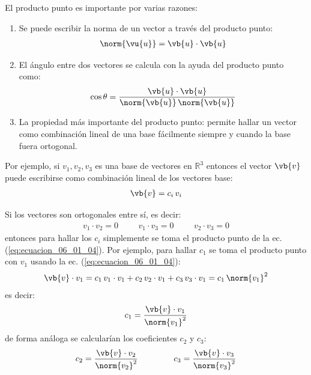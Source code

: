 El producto punto es importante por varias razones:
\begin{enumerate}
\item  Se puede escribir la norma de un vector a través del producto punto:
\begin{align*}
\norm{\vu{u}} = \vb{u} \cdot \vb{u}
\end{align*}
\item  El ángulo entre dos vectores se calcula con la ayuda del producto punto como:
\begin{align*}
\cos \theta = \dfrac{\vb{u} \cdot \vb{u}}{\norm{\vb{u}} \, \norm{\vb{u}}}
\end{align*}
\item  La propiedad más importante del producto punto: permite hallar un vector como combinación lineal de una base fácilmente siempre y cuando la base fuera ortogonal. 
\end{enumerate}

Por ejemplo, si $v_{1}, v_{2}, v_{3}$ es una base de vectores en $\mathbb{R}^{3}$ entonces el vector $\vb{v}$ puede escribirse como combinación lineal de los vectores base:
\begin{align}
\vb{v} = c_{i} \, v_{i}
\label{eq:ecuacion_06_01_04}
\end{align}

Si los vectores son ortogonales entre sí, es decir:
\begin{align*}
v_{1} \cdot v_{2} = 0 \hspace{1cm} v_{1} \cdot v_{3} = 0  \hspace{1cm} v_{2} \cdot v_{3} = 0
\end{align*}
entonces para hallar los $c_{i}$ simplemente se toma el producto punto de la ec. (\ref{eq:ecuacion_06_01_04}). Por ejemplo, para hallar $c_{1}$ se toma el producto punto con $v_{1}$ usando la ec. (\ref{eq:ecuacion_06_01_04}):
\begin{align*}
\vb{v} \cdot v_{1} = c_{1} \, v_{1} \cdot v_{1} + c_{2} \, v_{2} \cdot v_{1} + c_{3} \, v_{3} \cdot v_{1} = c_{1} \, \norm{v_{1}}^{2}
\end{align*}
es decir:
\begin{align*}
c_{1} = \dfrac{\vb{v} \cdot v_{1}}{\norm{v_{1}}^{2}}
\end{align*}
de forma análoga se calcularían los coeficientes $c_{2}$ y $c_{3}$:
\begin{align*}
c_{2} = \dfrac{\vb{v} \cdot v_{2}}{\norm{v_{2}}^{2}} \hspace{1.5cm} c_{3} = \dfrac{\vb{v} \cdot v_{3}}{\norm{v_{3}}^{2}} 
\end{align*}

